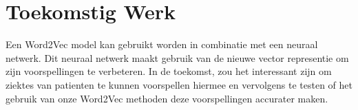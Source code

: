 \documentclass[11pt, final, journal, twoside, a4paper]{IEEEtran}
\begin{document}
\section{Toekomstig Werk}

Een Word2Vec model kan gebruikt worden in combinatie met een neuraal netwerk. Dit neuraal netwerk maakt gebruik van de nieuwe vector representie om zijn voorspellingen te verbeteren. In de toekomst, zou het interessant zijn om ziektes van patienten te kunnen voorspellen hiermee en vervolgens te testen of het gebruik van onze Word2Vec methoden deze voorspellingen accurater maken. 


%
%


%
\end{document}

